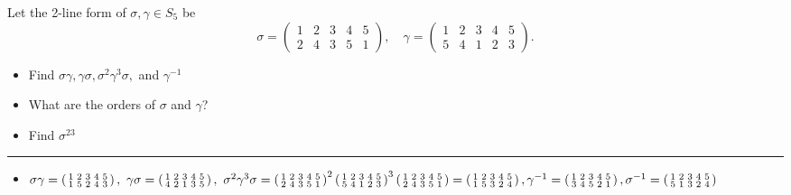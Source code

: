 \documentclass[titlepage]{article}
\newenvironment{problem}[2][Problem]{\begin{trivlist}
\item[\hskip \labelsep {\bfseries #1}\hskip \labelsep {\bfseries #2.}]}{\end{trivlist}}
\begin{document}
\begin{problem}{8}
Let the 2-line form of $\sigma, \gamma \in S_5$ be
$$\sigma = \left(\begin{array}{ccccc} 1 & 2 & 3 & 4 & 5 \\ 2 & 4 & 3 & 5 & 1 \end{array}\right) , \quad \gamma = \left(\begin{array}{ccccc} 1 & 2 & 3 & 4 & 5 \\ 5 & 4 & 1 & 2 & 3 \end{array}\right).$$
\begin{itemize}
\item[(a)] Find $\sigma\gamma, \gamma\sigma, \sigma^2\gamma^3\sigma,$ and $\gamma^{-1}$
\item[(b)] What are the orders of $\sigma$ and $\gamma$?
\item[(c)] Find $\sigma^{23}$
\end{itemize}
\hrule
\begin{itemize}
\item[(a)] $\sigma\gamma = \left(\begin{smallmatrix} 1 & 2 & 3 & 4 & 5 \\ 1 & 5 & 2 & 4 & 3\end{smallmatrix}\right), \ \gamma \sigma = \left(\begin{smallmatrix}1 & 2 & 3 & 4 & 5 \\ 4 & 2 & 1 & 3 & 5 \end{smallmatrix}\right), \ \sigma^2\gamma^3\sigma =  \left(\begin{smallmatrix}1 & 2 & 3 & 4 & 5 \\ 2 & 4 & 3 & 5 & 1 \end{smallmatrix}\right)^2  \left(\begin{smallmatrix}1 & 2 & 3 & 4 & 5 \\ 5 & 4 & 1 & 2 & 3 \end{smallmatrix}\right)^3  \left(\begin{smallmatrix}1 & 2 & 3 & 4 & 5 \\ 2 & 4 & 3 & 5 & 1 \end{smallmatrix}\right) =  \left(\begin{smallmatrix}1 & 2 & 3 & 4 & 5 \\ 1 & 5 & 3 & 2 & 4 \end{smallmatrix}\right), \\ \gamma^{-1} =\left(\begin{smallmatrix} 1 & 2 & 3 & 4 & 5 \\  3 & 4 & 5 & 2 & 1 \end{smallmatrix}\right), \sigma^{-1} = \left(\begin{smallmatrix} 1 & 2 & 3 & 4 & 5 \\  5 & 1 & 3 & 2 & 4 \end{smallmatrix}\right)$


\end{itemize}
\end{problem}
\end{document}
